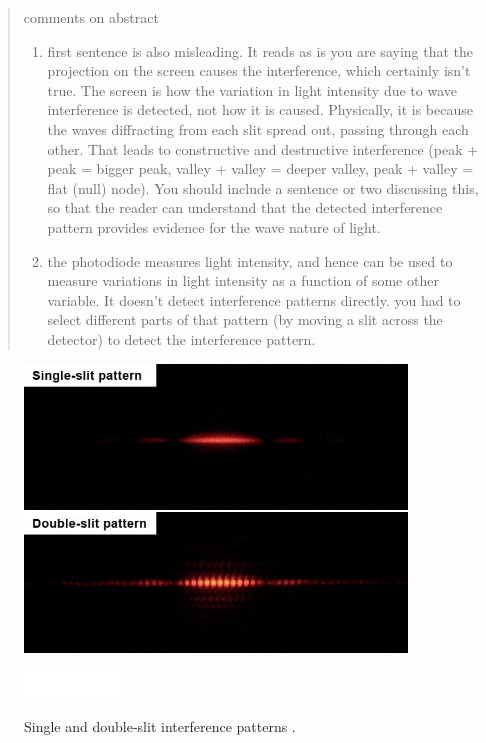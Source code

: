 \documentclass[prb,preprint]{revtex4-1}
\begin{document}
\begin{abstract}
{\color{blue} comments on abstract
\begin{enumerate}
\item first sentence is also misleading. It reads as is you are saying that the projection on the screen causes the interference, which certainly isn't true. The screen is how the variation in light intensity due to wave interference is detected, not how it is caused.  Physically, it is because the waves diffracting from each slit spread out, passing through each other. That leads to constructive and destructive interference (peak + peak = bigger peak, valley + valley = deeper valley, peak + valley = flat (null) node).  You should include a sentence or two discussing this, so that the reader can understand that the detected interference pattern provides evidence for the wave nature of light. 
\item the photodiode measures light intensity, and hence can be used to measure variations in light intensity as a function of some other variable. It doesn't detect interference patterns directly. you had to select different parts of that pattern (by moving a slit across the detector) to detect the interference pattern. 
\end{enumerate}
}

\end{abstract}

\begin{figure}[b]
\centering
\includegraphics[width=4in]{image1.jpg}
\caption{Single and double-slit interference patterns \cite{wik}.}
\includegraphics[width=1in]{white.png}
\label{image}
\end{figure}
\end{document}
